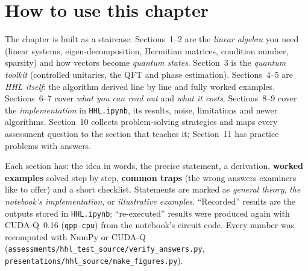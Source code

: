 \documentclass[11pt,a4paper,openany]{book}
\begin{document}
\section*{How to use this chapter}
The chapter is built as a staircase. Sections~1--2 are the \emph{linear algebra} you need (linear systems, eigen-decomposition, Hermitian
matrices, condition number, sparsity) and how vectors become \emph{quantum states}. Section~3 is the \emph{quantum toolkit} (controlled unitaries,
the QFT and phase estimation). Sections~4--5 are \emph{HHL itself}: the algorithm derived line by line and fully worked examples. Sections~6--7
cover \emph{what you can read out} and \emph{what it costs}. Sections~8--9 cover the \emph{implementation} in \texttt{HHL.ipynb}, its results,
noise, limitations and newer algorithms. Section~10 collects problem-solving strategies and maps every assessment question to the section
that teaches it; Section~11 has practice problems with answers.

Each section has: the idea in words, the precise statement, a derivation, \textbf{worked examples} solved step by step,
\textbf{common traps} (the wrong answers examiners like to offer) and a short checklist. Statements are marked as \emph{general
theory}, \emph{the notebook's implementation}, or \emph{illustrative examples}. ``Recorded'' results are the outputs stored in \texttt{HHL.ipynb};
``re-executed'' results were produced again with CUDA-Q~0.16 (\texttt{qpp-cpu}) from the notebook's circuit code. Every number was recomputed
with NumPy or CUDA-Q (\texttt{assessments/hhl\_test\_source/verify\_answers.py}, \texttt{presentations/hhl\_source/make\_figures.py}).
\end{document}
